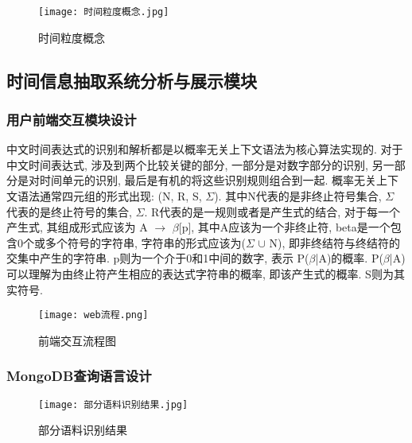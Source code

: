 \begin{figure}[h]
    \centering
    \texttt{[image: 时间粒度概念.jpg]}
    \caption{时间粒度概念}
\end{figure}

\subsection{时间信息抽取系统分析与展示模块}

\subsubsection{用户前端交互模块设计}

中文时间表达式的识别和解析都是以概率无关上下文语法为核心算法实现的.
对于中文时间表达式, 涉及到两个比较关键的部分, 一部分是对数字部分的识别, 另一部分是对时间单元的识别, 最后是有机的将这些识别规则组合到一起.
概率无关上下文语法通常四元组的形式出现: (N, R, S,  $\varSigma$). 其中N代表的是非终止符号集合, $\varSigma$ 代表的是终止符号的集合, $\varSigma$.
R代表的是一规则或者是产生式的结合, 对于每一个产生式, 其组成形式应该为 A $\rightarrow$ $\beta$[p], 其中A应该为一个非终止符, beta是一个包含0个或多个符号的字符串,
字符串的形式应该为($\varSigma$ $\cup$ N), 即非终结符与终结符的交集中产生的字符串. p则为一个介于0和1中间的数字, 表示 P($\beta$|A)的概率.
P($\beta$|A)可以理解为由终止符产生相应的表达式字符串的概率, 即该产生式的概率.
S则为其实符号.

\begin{figure}[h]
    \centering
    \texttt{[image: web流程.png]}
    \caption{前端交互流程图}
\end{figure}


\subsubsection{MongoDB查询语言设计}


\begin{figure}[h]
    \centering
    \texttt{[image: 部分语料识别结果.jpg]}
    \caption{部分语料识别结果}
\end{figure}

